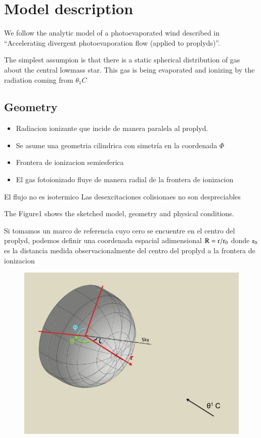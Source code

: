 \documentclass{article}
\begin{document}


\section{Model description}
\label{cap:description}

We follow the analytic model of a photoevaporated wind described in \citet{1998AJ....116..322H} ``Accelerating divergent photoevaporation flow (applied to proplyds)''.
 
The simplest assumpion is that there is a static spherical distribution of gas about the central lowmass star. This gas is being evaporated and ionizing by the radiation coming from $\theta_1 C$


\subsection{Geometry}
\label{cap:geometry}

\begin{itemize}
\item{Radiacion ionizante que incide de manera paralela al proplyd.}
\item{Se asume una geometria cilindrica con simetría en la coordenada $\Phi$}
\item{Frontera de ionizacion semiesferica}
\item{El gas fotoionizado fluye de manera radial de la frontera de ionizacion}
\end{itemize}


El flujo no es isotermico
Las desexcitaciones colisionaes no son despreciables

The Figure1 shows the sketched model, geometry and physical conditions.

Si tomamos un marco de referencia cuyo cero se encuentre en el centro
del proplyd, podemos definir una coordenada espacial adimensional $\rm
R = r / r_0$ donde $\rm r_0$ es la distancia medida observacionalmente
del centro del proplyd a la frontera de ionizacion

\begin{figure}[h]
  \centering
  \includegraphics[width=8.5 cm]{./graf_model_3D/geometry_model.jpg}
  \caption{} \label{fig:geometry}
\end{figure}
\end{document}

